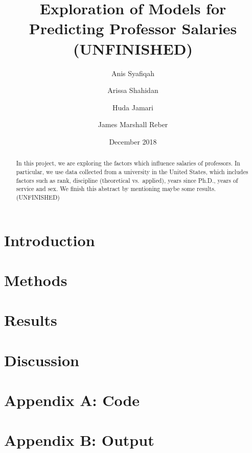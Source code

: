 \documentclass[10pt,a4paper]{amsart}
\author[1]{Anis Syafiqah}
\author[2]{Arissa Shahidan}
\author[3]{Huda Jamari}
\author[4]{James Marshall Reber}
\title{Exploration of Models for Predicting Professor Salaries (UNFINISHED)}
\date{December 2018}
\theoremstyle{definition}
\numberwithin{definition}{section}
\begin{document}
\begin{abstract}
In this project, we are exploring the factors which influence salaries of professors. In particular, we use data\cite{fox2011r} collected from a university in the United States, which includes factors such as rank, discipline (theoretical vs.\ applied), years since Ph.D., years of service and sex. We finish this abstract by mentioning maybe some results. (UNFINISHED)
\end{abstract}
\maketitle


\tableofcontents

\section{Introduction}

\section{Methods}

\section{Results}

\section{Discussion}

\section{Appendix A: Code}

\section{Appendix B: Output}



\end{document}
